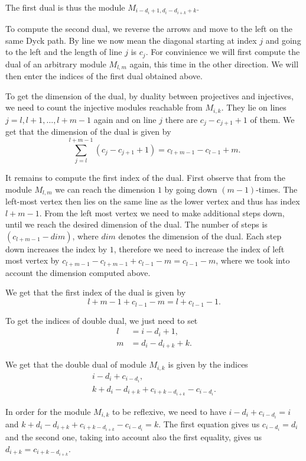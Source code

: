 \documentclass[12pt, a4paper]{article}
\numberwithin{equation}{section}
\theoremstyle{definition}
\theoremstyle{plain}
\theoremstyle{remark}
\begin{document}
The first dual is thus the module $M_{i - d_i + 1, d_i - d_{i+k} + k}$.

To compute the second dual, we reverse the arrows and move to the left on the same Dyck path. By line we now mean the diagonal starting at index $j$ and going to the left and the length of line $j$ is $c_j$.
For convinience we will first compute the dual of an arbitrary module $M_{l,m}$ again, this time in the other direction. We will then enter the indices of the first dual obtained above.

To get the dimension of the dual, by duality between projectives and injectives, we need to count the injective modules reachable from $M_{i,k}$.
They lie on lines $j = l, l+1, \dots, l+m-1$ again and on line $j$ there are $c_j - c_{j+1} + 1$ of them.
We get that the dimension of the dual is given by
\begin{equation}
\label{eq:injectives}      
\sum_{j=l}^{l+m-1} (c_j - c_{j+1} + 1) = c_{l+m-1} - c_{l-1} + m.
\end{equation}

It remains to compute the first index of the dual.
First observe that from the module $M_{l,m}$ we can reach the dimension $1$ by going down $(m - 1)$-times. The left-most vertex then lies on the same line as the lower vertex and thus has index $l + m - 1$.
From the left most vertex we need to make additional steps down, until we reach the desired dimension of the dual.
The number of steps is $(c_{l+m-1} - dim)$, where $dim$ denotes the dimension of the dual.
Each step down increases the index by $1$, therefore we need to increase the index of left most vertex by $c_{l+m-1} - c_{l+m-1} + c_{l-1} - m = c_{l-1} - m$, where we took into account the dimension computed above.

We get that the first index of the dual is given by 
$$l + m - 1 + c_{l-1} - m = l + c_{l-1} - 1.$$

To get the indices of double dual, we just need to set 
\begin{align*}
    l &= i - d_i + 1, \\
    m &= d_i - d_{i+k} + k.
\end{align*}

We get that the double dual of module $M_{i,k}$ is given by the indices
\begin{align*}
    i - d_i + c_{i - d_i}, \\
    k + d_i - d_{i+k} + c_{i+k-{d_{i+k}}} - c_{i-d_i}.
\end{align*}

In order for the module $M_{i,k}$ to be reflexive, we need to have $i - d_i + c_{i - d_i} = i$ and $k + d_i - d_{i+k} + c_{i+k-{d_{i+k}}} - c_{i-d_i} = k$.
The first equation gives us $c_{i - d_i} = d_i$ and the second one, taking into account also the first equality, gives us $d_{i+k} = c_{i+k-{d_{i+k}}}$.



 

\end{document}
